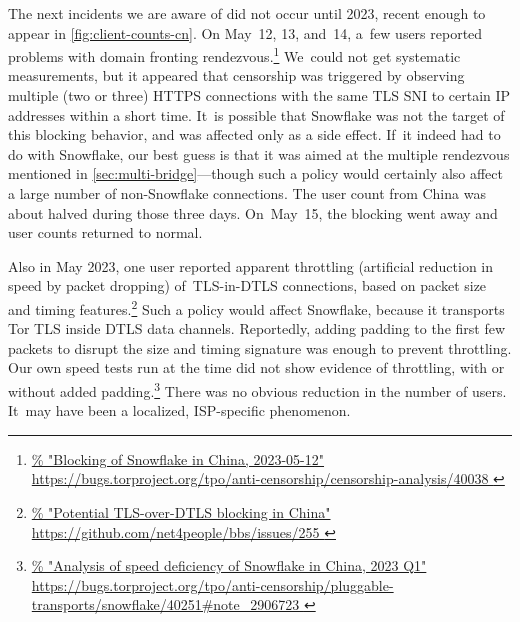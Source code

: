 \documentclass[letterpaper,twocolumn]{article}
\newlength{\urlfootnotesize}
\newcommand{\urlfootnote}[1]{\footnote{
\raggedright\fontsize{\urlfootnotesize}{\urlfootnotesize}\selectfont\url{#1}
}}
\begin{document}
The next incidents we are aware of did not occur until 2023,
recent enough to appear in \autoref{fig:client-counts-cn}.
On May~12, 13, and~14, a~few users reported problems
with domain fronting rendezvous.\urlfootnote{
https://bugs.torproject.org/tpo/anti-censorship/censorship-analysis/40038
}
We~could not get systematic measurements,
but it appeared that censorship was triggered
by observing multiple (two or three) HTTPS connections
with the same TLS SNI to certain IP addresses within a short time.
It~is possible that Snowflake was not the target of this
blocking behavior, and was affected only as a side effect.
If~it indeed had to do with Snowflake,
our best guess is that it was aimed at the multiple rendezvous
mentioned in \autoref{sec:multi-bridge}---though such a
policy would certainly also affect a large number of non-Snowflake connections.
The user count from China was about halved during those three days.
On~May~15, the blocking went away and user counts returned to normal.

Also in May 2023, one user reported apparent throttling
(artificial reduction in speed by packet dropping)
of~TLS-in-DTLS connections,
based on packet size and timing features.\urlfootnote{
https://github.com/net4people/bbs/issues/255
}
Such a policy would affect Snowflake,
because it transports Tor TLS inside DTLS data channels.
Reportedly, adding padding to the first few packets
to disrupt the size and timing signature was enough
to prevent throttling.
Our own speed tests run at the time
did not show evidence of throttling,
with or without added padding.\urlfootnote{
https://bugs.torproject.org/tpo/anti-censorship/pluggable-transports/snowflake/40251\#note_2906723
}
There was no obvious reduction in the number of users.
It~may have been a localized, ISP-specific phenomenon.

\end{document}
